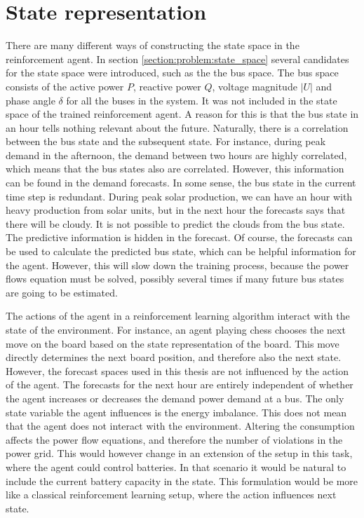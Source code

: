 \documentclass[class=book, crop=false]{standalone}
\begin{document}
\section{State representation}
There are many different ways of constructing the state space in the reinforcement agent. In section \ref{section:problem:state_space} several candidates for the state space were introduced, such as the the bus space. The bus space consists of the active power $P$, reactive power $Q$, voltage magnitude $|U|$ and phase angle $\delta$ for all the buses in the system. It was not included in the state space of the trained reinforcement agent. A reason for this is that the bus state in an hour tells nothing relevant about the future. Naturally, there is a correlation between the bus state and the subsequent state. For instance, during peak demand in the afternoon, the demand between two hours are highly correlated, which means that the bus states also are correlated. However, this information can be found in the demand forecasts. In some sense, the bus state in the current time step is redundant. During peak solar production, we can have an hour with heavy production from solar units, but in the next hour the forecasts says that there will be cloudy. It is not possible to predict the clouds from the bus state. The predictive information is hidden in the forecast. Of course, the forecasts can be used to calculate the predicted bus state, which can be helpful information for the agent. However, this will slow down the training process, because the power flows equation must be solved, possibly several times if many future bus states are going to be estimated. 

The actions of the agent in a reinforcement learning algorithm interact with the state of the environment. For instance, an agent playing chess chooses the next move on the board based on the state representation of the board. This move directly determines the next board position, and therefore also the next state. However, the forecast spaces used in this thesis are not influenced by the action of the agent. The forecasts for the next hour are entirely independent of whether the agent increases or decreases the demand power demand at a bus. The only state variable the agent influences is the energy imbalance. This does not mean that the agent does not interact with the environment. Altering the consumption affects the power flow equations, and therefore the number of violations in the power grid. 
This would however change in an extension of the setup in this task, where the agent could control batteries. In that scenario it would be natural to include the current battery capacity in the state. This formulation would be more like a classical reinforcement learning setup, where the action influences next state.
\end{document}
